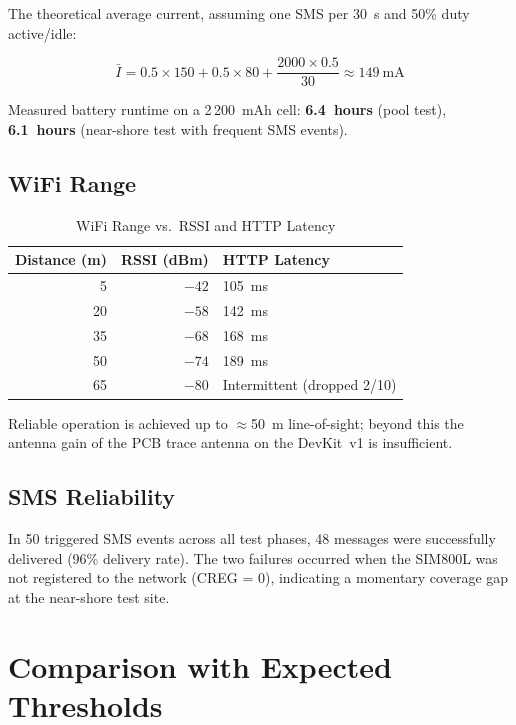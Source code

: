 \noindent The theoretical average current, assuming one SMS per 30~s and 50\% duty
active/idle:

\begin{equation}
  \bar{I} = 0.5 \times 150 + 0.5 \times 80 +
            \frac{2000 \times 0.5}{30} \approx 149~\textrm{mA}
\end{equation}

Measured battery runtime on a 2\,200~mAh cell: \textbf{6.4~hours} (pool test),
\textbf{6.1~hours} (near-shore test with frequent SMS events).

\subsection{WiFi Range}

\begin{table}[H]
\centering
\caption{WiFi Range vs.\ RSSI and HTTP Latency}
\label{tab:wifi}
\begin{tabular}{rrl}
\toprule
\textbf{Distance (m)} & \textbf{RSSI (dBm)} & \textbf{HTTP Latency} \\
\midrule
 5   & $-42$ & 105~ms \\
20   & $-58$ & 142~ms \\
35   & $-68$ & 168~ms \\
50   & $-74$ & 189~ms \\
65   & $-80$ & Intermittent (dropped 2/10) \\
\bottomrule
\end{tabular}
\end{table}

Reliable operation is achieved up to $\approx$50~m line-of-sight; beyond this the
antenna gain of the PCB trace antenna on the DevKit~v1 is insufficient.

\subsection{SMS Reliability}

In 50 triggered SMS events across all test phases, 48 messages were successfully
delivered (96\% delivery rate).
The two failures occurred when the SIM800L was not registered to the network
(CREG = 0), indicating a momentary coverage gap at the near-shore test site.

\section{Comparison with Expected Thresholds}

